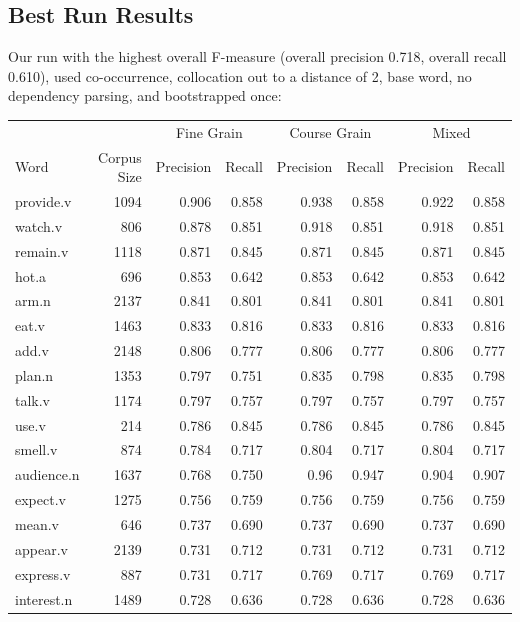 \documentclass{article}
\begin{document}
\subsection{Best Run Results}

Our run with the highest overall F-measure (overall precision 0.718, overall
recall 0.610), used co-occurrence, collocation out to a distance of 2, base word,
no dependency parsing, and bootstrapped once:

\begin{longtable}{l | r r r r r r r}
		&	&	\multicolumn{2}{c}{Fine Grain}	&	\multicolumn{2}{c}{Course Grain}	&	\multicolumn{2}{c}{Mixed}\\
Word	&	Corpus Size	&	Precision	&	Recall	&	Precision	&	Recall	&	Precision	&	Recall\\
\hline
provide.v   	&	1094	&	0.906	&	0.858	&	0.938	&	0.858	&	0.922	&	0.858\\
watch.v     	&	806 	&	0.878	&	0.851	&	0.918	&	0.851	&	0.918	&	0.851\\
remain.v    	&	1118	&	0.871	&	0.845	&	0.871	&	0.845	&	0.871	&	0.845\\
hot.a       	&	696 	&	0.853	&	0.642	&	0.853	&	0.642	&	0.853	&	0.642\\
arm.n       	&	2137	&	0.841	&	0.801	&	0.841	&	0.801	&	0.841	&	0.801\\
eat.v       	&	1463	&	0.833	&	0.816	&	0.833	&	0.816	&	0.833	&	0.816\\
add.v       	&	2148	&	0.806	&	0.777	&	0.806	&	0.777	&	0.806	&	0.777\\
plan.n      	&	1353	&	0.797	&	0.751	&	0.835	&	0.798	&	0.835	&	0.798\\
talk.v      	&	1174	&	0.797	&	0.757	&	0.797	&	0.757	&	0.797	&	0.757\\
use.v       	&	214 	&	0.786	&	0.845	&	0.786	&	0.845	&	0.786	&	0.845\\
smell.v     	&	874 	&	0.784	&	0.717   &	0.804	&	0.717   &	0.804	&	0.717\\
audience.n    	&	1637	&	0.768	&	0.750	&	0.96	&	0.947	&	0.904	&	0.907\\
expect.v    	&	1275	&	0.756	&	0.759	&	0.756	&	0.759	&	0.756	&	0.759\\
mean.v      	&	646 	&	0.737	&	0.690	&	0.737	&	0.690	&	0.737	&	0.690\\
appear.v    	&	2139	&	0.731	&	0.712	&	0.731	&	0.712	&	0.731	&	0.712\\
express.v    	&	887 	&	0.731	&	0.717   &	0.769	&	0.717   &	0.769	&	0.717\\
interest.n    	&	1489	&	0.728	&	0.636	&	0.728	&	0.636	&	0.728	&	0.636\\

\end{longtable}
\end{document}
